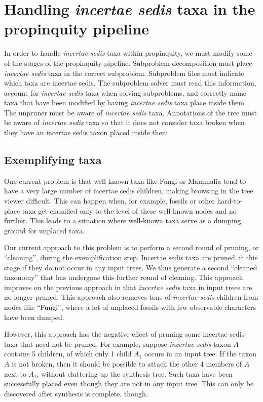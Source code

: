 \documentclass[english]{article}
\begin{document}
\section{Handling \emph{incertae sedis} taxa in the propinquity
pipeline}

In order to handle \emph{incertae sedis} taxa within propinquity, we
must modify some of the stages of the propinquity pipeline.
Subproblem
decomposition must place \emph{incertae sedis} taxa in the correct
subproblem.
Subproblem files must indicate which taxa are incertae
sedis.
The subproblem solver must read this information, account for
\emph{incertae sedis} taxa when solving subproblems, and correctly
name taxa that have been modified by having \emph{incertae sedis} taxa
place inside them.
The unpruner must be aware of \emph{incertae sedis}
taxa.
Annotations of the tree must be aware of \emph{incertae sedis}
taxa so that it does not consider taxa broken when they have an
incertae sedis taxon placed inside them.

\subsection{Exemplifying taxa}

One current problem is that well-known taxa like Fungi or Mammalia
tend to have a very large number of incertae sedis children, making
browsing in the tree viewer difficult.
This can happen when, for
example, fossils or other hard-to- place taxa get classified only to
the level of these well-known nodes and no further.
This leads to a
situation where well-known taxa serve as a dumping ground for unplaced
taxa.

Our current approach to this problem is to perform a second round of
pruning, or ``cleaning'', during the exemplification step.
Incertae
sedis taxa are pruned at this stage if they do not occur in any input
trees.
We thus generate a second ``cleaned taxonomy'' that has
undergone this further round of cleaning.
This approach improves on
the previous approach in that \emph{incertae sedis} taxa in input
trees are no longer pruned.
This approach also removes tons of
\emph{incertae sedis} children from nodes like ``Fungi'', where a lot
of unplaced fossils with few observable characters have been dumped.

However, this approach has the negative effect of pruning some
incertae sedis taxa that need not be pruned.
For example, suppose
\emph{incertae sedis} taxon $A$ contains 5 children, of which only 1
child $A_{1}$ occurs in an input tree.
If the taxon $A$ is not broken,
then it should be possible to attach the other 4 members of $A$ next
to $A_{1}$, without cluttering up the synthesis tree.
Such taxa have
been successfully placed even though they are not in any input tree.
This can only be discovered after synthesis is complete, though.
\end{document}
